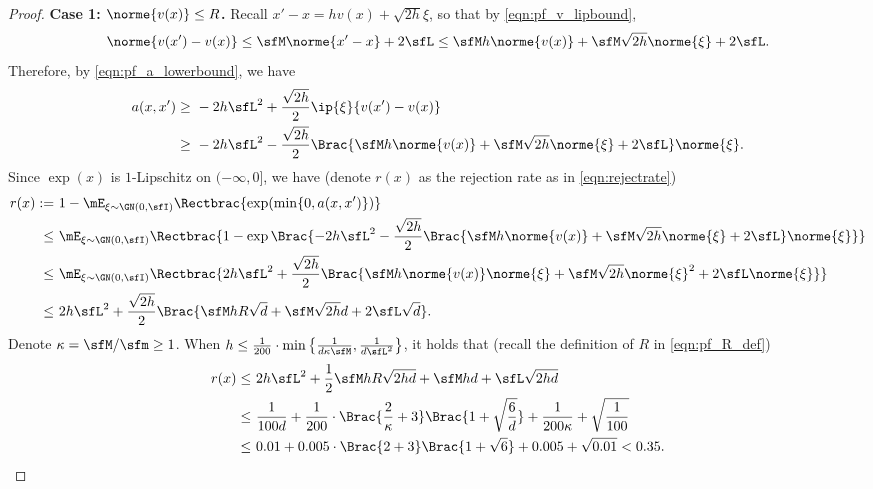 \documentclass[11pt]{article}
\begin{document}
\begin{proof}
\noindent
{\bf Case 1: $\norme{v(x)} \le R$.} 
Recall $ x' - x = h v(x) + \sqrt{2h} \xi $, so that by \eqref{eqn:pf_v_lipbound},
\[
    \norme{v(x')-v(x)} \le \sfM \norme{x'-x} + 2 \sfL \le \sfM h \norme{v(x)} + \sfM \sqrt{2h} \norme{\xi} + 2 \sfL.
\]
Therefore, by \eqref{eqn:pf_a_lowerbound}, we have
\begin{align*}
    a(x,x') \ge~& - 2 h \sfL^2 + \frac{\sqrt{2h}}{2} \ip{ \xi }{v(x')-v(x)} \\
    \ge~& - 2 h \sfL^2 - \frac{\sqrt{2h}}{2} \Brac{ \sfM h \norme{v(x)} + \sfM \sqrt{2h} \norme{\xi} + 2 \sfL } \norme{ \xi }. 
\end{align*}
Since $\exp(x)$ is $1$-Lipschitz on $(-\infty,0]$, we have (denote $r(x)$ as the rejection rate as in \eqref{eqn:rejectrate})
\begin{align*}
    r(x) := ~& 1 - \mE_{\xi\sim \GN(0,\sfI)} \Rectbrac{ \exp(\min\{0,a(x,x')\}) } \\
    \le~& \mE_{\xi\sim \GN(0,\sfI)} \Rectbrac{ 1 - \exp \Brac{ - 2 h \sfL^2 - \frac{\sqrt{2h}}{2} \Brac{ \sfM h \norme{v(x)} + \sfM \sqrt{2h} \norme{\xi} + 2 \sfL } \norme{ \xi } } } \\
    \le~& \mE_{\xi\sim \GN(0,\sfI)} \Rectbrac{ 2 h \sfL^2 + \frac{\sqrt{2h}}{2} \Brac{ \sfM h \norme{v(x)} \norme{ \xi } + \sfM \sqrt{2h} \norme{\xi}^2 + 2 \sfL \norme{ \xi } }  } \\
    \le~& 2 h \sfL^2 + \frac{\sqrt{2h}}{2} \Brac{ \sfM h R \sqrt{d} + \sfM \sqrt{2h} d + 2 \sfL \sqrt{d} }.  
\end{align*}
Denote $\kappa = \sfM/\sfm \ge 1$.
When $h \le \frac{1}{200} \cdot \min \left\{ \frac{1}{d\kappa \sfM} , \frac{1}{d\sfL^2} \right\}$,
it holds that (recall the definition of $R$ in \eqref{eqn:pf_R_def})
\begin{align*}
    r(x) \le~& 2 h \sfL^2 + \frac{1}{2} \sfM h R \sqrt{2hd} + \sfM h d + \sfL \sqrt{2hd} \\
    \le~& \frac{1}{100d} + \frac{1}{200} \cdot \Brac{ \frac{2}{\kappa} + 3 } \Brac{ 1 + \sqrt{\frac{6}{d}} } + \frac{1}{200\kappa} + \sqrt{\frac{1}{100}} \\ 
    \le~& 0.01 + 0.005 \cdot \Brac{ 2 + 3 } \Brac{ 1 + \sqrt{6} } + 0.005 + \sqrt{0.01} < 0.35. 
\end{align*}


\end{proof}
\end{document}
